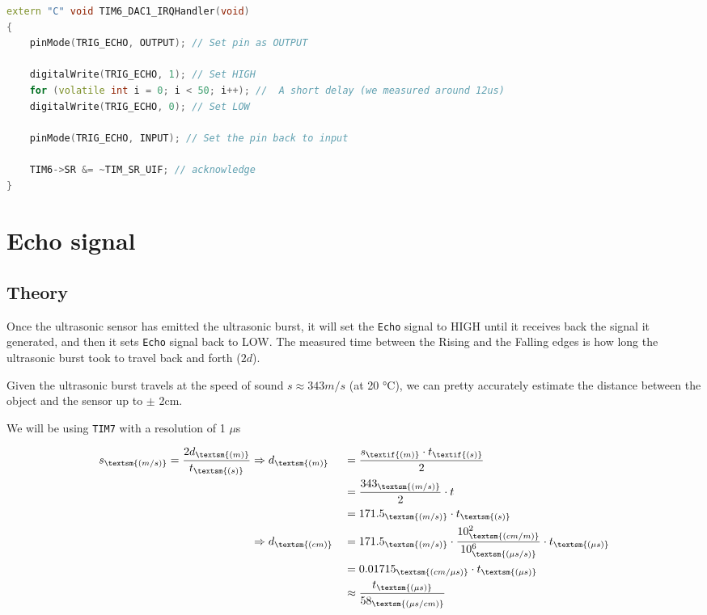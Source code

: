 \documentclass{article}
\begin{document}
\begin{lstlisting}[language=C++, caption={TIM6 Interrupt handler: Trig signal generation}]
extern "C" void TIM6_DAC1_IRQHandler(void)
{
    pinMode(TRIG_ECHO, OUTPUT); // Set pin as OUTPUT

    digitalWrite(TRIG_ECHO, 1); // Set HIGH
    for (volatile int i = 0; i < 50; i++); //  A short delay (we measured around 12us)
    digitalWrite(TRIG_ECHO, 0); // Set LOW

    pinMode(TRIG_ECHO, INPUT); // Set the pin back to input

    TIM6->SR &= ~TIM_SR_UIF; // acknowledge
}   
\end{lstlisting}

\section{Echo signal}

\subsection{Theory}

Once the ultrasonic sensor has emitted the ultrasonic burst, it will set the \verb|Echo| signal to HIGH until it receives back the signal it generated, and then it sets \verb|Echo| signal back to LOW. The measured time between the Rising and the Falling edges is how long the ultrasonic burst took to travel back and forth ($2d$).

Given the ultrasonic burst travels at the speed of sound $s \approx 343 m/s$ (at 20 °C), we can pretty accurately estimate the distance between the object and the sensor up to $\pm$ 2cm.

We will be using \verb|TIM7| with a resolution of 1 $\mu$s

\begin{alignat*}{2}
s _\textsm{(m/s)} = \frac{2d _\textsm{(m)}}{t _\textsm{(s)}}
&\Rightarrow d _\textsm{(m)} &&= \frac{s _\textif{(m)} \cdot t _\textif{(s)}}{2} \\
& &&= \frac{343 _\textsm{(m/s)}}{2} \cdot t \\ 
& &&= 171.5 _\textsm{(m/s)} \cdot t _\textsm{(s)} \\
&\Rightarrow d _\textsm{(cm)} &&= 171.5 _\textsm{(m/s)} \cdot \frac{10^2 _\textsm{(cm/m)}}{10^6 _\textsm{(\mu s/s)}} \cdot t _\textsm{(\mu s)} \\
& &&= 0.01715 _\textsm{(cm/\mu s)} \cdot t _\textsm{(\mu s)} \\
& && \approx \frac{t _\textsm{(\mu s)}}{58 _\textsm{(\mu s/cm)}}
\end{alignat*}
\end{document}
